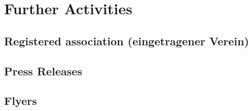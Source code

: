 ﻿\section{Further Activities}

\subsection{Registered association (eingetragener Verein)}
\tbc[by DB]

\subsection{Press Releases}
\tbc

\subsection{Flyers}
\tbc

